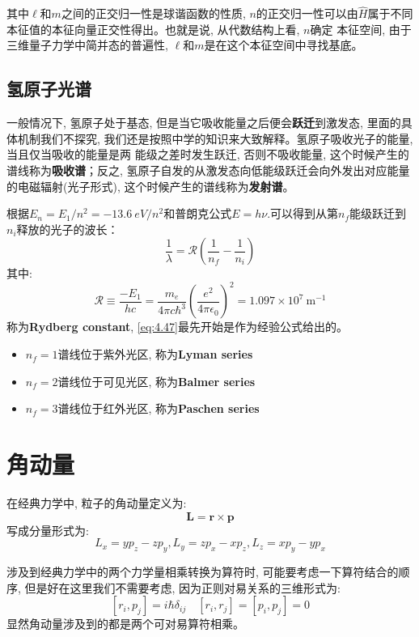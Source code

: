 \documentclass[a4paper,zihao=-4,linespread=1]{ctexrep}
\begin{document}
    其中$\ell$和$m$之间的正交归一性是球谐函数的性质, $n$的正交归一性可以由$\hat{H}$属于不同本征值的本征向量正交性得出。也就是说, 从代数结构上看, $n$确定
    本征空间, 由于三维量子力学中简并态的普遍性, $\ell$和$m$是在这个本征空间中寻找基底。
    \subsection{氢原子光谱}
    一般情况下, 氢原子处于基态, 但是当它吸收能量之后便会\textbf{跃迁}到激发态, 里面的具体机制我们不探究, 我们还是按照中学的知识来大致解释。氢原子吸收光子的能量, 当且仅当吸收的能量是两
    能级之差时发生跃迁, 否则不吸收能量, 这个时候产生的谱线称为\textbf{吸收谱}；反之, 氢原子自发的从激发态向低能级跃迁会向外发出对应能量的电磁辐射(光子形式), 这个时候产生的谱线称为\textbf{发射谱}。
    
    根据$E_n=E_1/n^2=-\SI{13.6}{eV}/{n^2}$和普朗克公式$E=h\nu$.可以得到从第$n_f$能级跃迁到$n_i$释放的光子的波长：
    \begin{equation}
        \label{eq:4.47}
        \frac{1}{\lambda}=\mathcal{R}\left(\frac{1}{n_f}-\frac{1}{n_i}\right)     
    \end{equation}
    其中:
    \[\mathcal{R} \equiv \frac{-E_1}{hc} = \frac{m_{e}}{4 \pi c \hbar^{3}}\left(\frac{e^{2}}{4 \pi \epsilon_{0}}\right)^{2}=1.097 \times 10^{7} \mathrm{~m}^{-1}\]
    称为\textbf{Rydberg constant}, \ref{eq:4.47}最先开始是作为经验公式给出的。
    \begin{itemize}
        \item $n_f=1$\quad 谱线位于紫外光区, 称为\textbf{Lyman series}
        \item $n_f=2$\quad 谱线位于可见光区, 称为\textbf{Balmer series}
        \item $n_f=3$\quad 谱线位于红外光区, 称为\textbf{Paschen series}
    \end{itemize}
    \section{角动量}
    在经典力学中, 粒子的角动量定义为:\[\bm{L}=\bm{r}\times\bm{p}\]写成分量形式为:\[L_x=yp_z-zp_y,L_y=zp_x-xp_z,L_z=xp_y-yp_x\]
    
    涉及到经典力学中的两个力学量相乘转换为算符时, 可能要考虑一下算符结合的顺序, 但是好在这里我们不需要考虑, 因为正则对易关系的三维形式为:
    \begin{equation}
        \left[r_i,p_j\right]=i\hbar\delta_{ij}\quad\left[r_i,r_j\right]=\left[p_i,p_j\right]=0
    \end{equation}
    显然角动量涉及到的都是两个可对易算符相乘。
    
\end{document}
